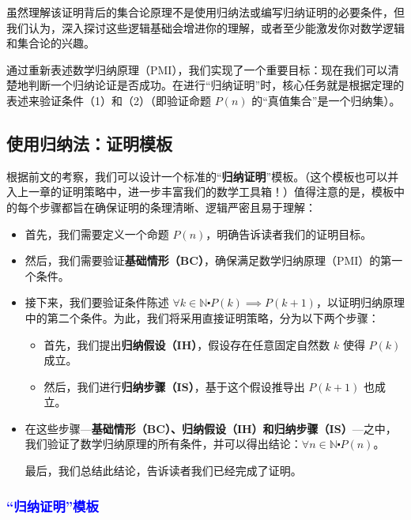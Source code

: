 虽然理解该证明背后的集合论原理不是使用归纳法或编写归纳证明的必要条件，但我们认为，深入探讨这些逻辑基础会增进你的理解，或者至少能激发你对数学逻辑和集合论的兴趣。

通过重新表述数学归纳原理（PMI），我们实现了一个重要目标：现在我们可以清楚地判断一个归纳论证是否成功。在进行``归纳证明''时，核心任务就是根据定理的表述来验证条件（1）和（2）（即验证命题 $P(n)$ 的``真值集合''是一个归纳集）。

\subsection{使用归纳法：证明模板}

根据前文的考察，我们可以设计一个标准的``\textbf{归纳证明}''模板。（这个模板也可以并入上一章的证明策略中，进一步丰富我们的数学工具箱！）值得注意的是，模板中的每个步骤都旨在确保证明的条理清晰、逻辑严密且易于理解：

\begin{itemize}
    \item 首先，我们需要定义一个命题 $P(n)$，明确告诉读者我们的证明目标。
    \item 然后，我们需要验证\textbf{基础情形（BC）}，确保满足数学归纳原理（PMI）的第一个条件。
    \item 接下来，我们要验证条件陈述 $\forall k \in \mathbb{N} \centerdot P(k) \implies P(k+1)$，以证明归纳原理中的第二个条件。为此，我们将采用直接证明策略，分为以下两个步骤：
        \begin{itemize}
            \item 首先，我们提出\textbf{归纳假设（IH）}，假设存在任意固定自然数 $k$ 使得 $P(k)$ 成立。
            \item 然后，我们进行\textbf{归纳步骤（IS）}，基于这个假设推导出 $P(k+1)$ 也成立。
        \end{itemize} 
    \item 在这些步骤---\textbf{基础情形（BC）、归纳假设（IH）和归纳步骤（IS）}---之中，我们验证了数学归纳原理的所有条件，并可以得出结论：$\forall n \in \mathbb{N} \centerdot P(n)$。
    
    最后，我们总结此结论，告诉读者我们已经完成了证明。
\end{itemize}

\subsubsection*{\textcolor{blue}{``归纳证明''模板}}

